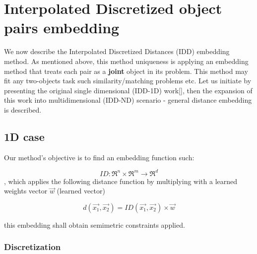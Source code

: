 
\chapter{Interpolated Discretized object pairs embedding} %

\label{Chapter3} %

We now describe the Interpolated Discretized Distances (IDD) embedding method.
As mentioned above, this method uniqueness is applying an embedding method that treats each pair as a \textbf{joint} object in its problem.
This method may fit any two-objects task such similarity/matching problems etc. 
Let us initiate by presenting the original single dimensional (IDD-1D) work[], then the expansion of this work into multidimensional (IDD-ND) scenario - general distance embedding is described.

\section{1D case}

	Our method's objective is to find an embedding function such:
	
	\begin{equation}
		ID:\Re^n \times \Re^m \rightarrow \Re^d
	\end{equation}
	, which applies the following distance function by multiplying with a learned weights vector $\overrightarrow{w}$ (learned vector)
	
	\begin{equation}
	d(\overrightarrow{x_1} , \overrightarrow{x_2}) = ID(\overrightarrow{x_1} , \overrightarrow{x_2}) \times \overrightarrow{w}
	\end{equation}
	
	this embedding shall obtain semimetric constraints applied.
	
	\subsection{Discretization}

